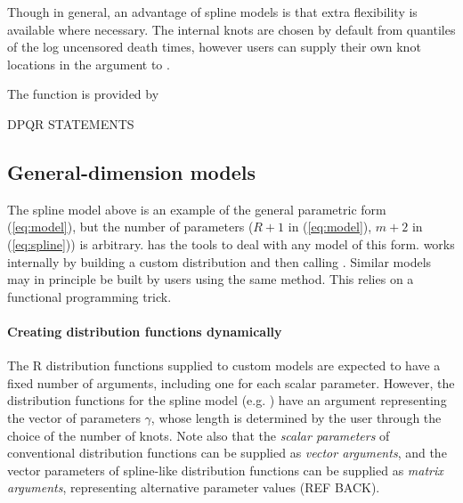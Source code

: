 \documentclass[nojss,nofooter]{jss}
\begin{document}
Though in general, an advantage of spline models is that extra
flexibility is available where necessary.  The internal knots are
chosen by default from quantiles of the log uncensored death times,
however users can supply their own knot locations in the 
argument to .

The function  is provided by 

DPQR STATEMENTS


\subsection{General-dimension models}
\label{sec:gdim}

The spline model above is an example of the general parametric form
(\ref{eq:model}), but the number of parameters ($R+1$ in
(\ref{eq:model}), $m+2$ in (\ref{eq:spline})) is arbitrary.
 has the tools to deal with any model of this form.
 works internally by building a custom
distribution and then calling .  Similar models may
in principle be built by users using the same method.  This relies on
a functional programming trick.

\paragraph{Creating distribution functions dynamically}

The R distribution functions supplied to custom models are expected to
have a fixed number of arguments, including one for each scalar
parameter.  However, the distribution functions for the spline model
(e.g. ) have an argument  representing
the vector of parameters $\gamma$, whose length is determined by the
user through the choice of the number of knots.  Note also that the
\emph{scalar parameters} of conventional distribution functions can be
supplied as \emph{vector arguments}, and the vector parameters of
spline-like distribution functions can be supplied as \emph{matrix
  arguments}, representing alternative parameter values (REF BACK).
\end{document}
